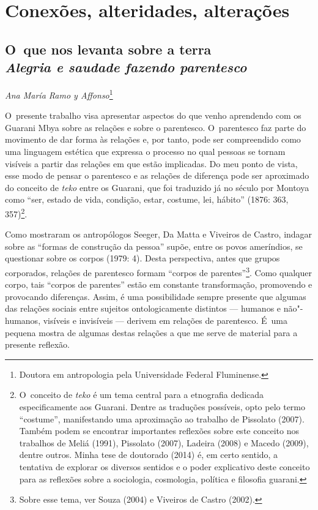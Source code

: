 \makeatletter\@openrightfalse
\movetooddpage
\part{Conexões, alteridades, alterações}
 


\chapter*{O~que nos levanta sobre a terra\\
\large{\emph{Alegria e saudade fazendo parentesco}}}


\@openrighttrue\makeatother
\begin{flushright}
\emph{Ana María Ramo y Affonso}\footnote{Doutora em antropologia pela
Universidade Federal Fluminense.}
\end{flushright}

\noindent
O~presente trabalho visa apresentar aspectos do que venho aprendendo com
os Guarani Mbya sobre as relações e sobre o parentesco. O~parentesco
faz parte do movimento de dar forma às relações e, por tanto, pode ser
compreendido como uma linguagem estética que expressa o processo no
qual pessoas se tornam visíveis a partir das relações em que estão
implicadas. Do meu ponto de vista, esse modo de pensar o parentesco e
as relações de diferença pode ser aproximado do conceito de \emph{teko} entre
os Guarani, que foi traduzido já no século  por Montoya como ``ser,
estado de vida, condição, estar, costume, lei, hábito'' (1876: 363,
357)\footnote{O~conceito de \emph{teko} é um tema central para a etnografia
dedicada especificamente aos Guarani. Dentre as traduções possíveis,
opto pelo termo ``costume'', manifestando uma aproximação ao trabalho de
Pissolato (2007). Também podem se encontrar importantes reflexões sobre
este conceito nos trabalhos de Meliá (1991), Pissolato (2007), Ladeira
(2008) e Macedo (2009), dentre outros. Minha tese de doutorado (2014)
é, em certo sentido, a tentativa de explorar os diversos sentidos e o
poder explicativo deste conceito para as reflexões sobre a sociologia,
cosmologia, política e filosofia guarani.}.

Como mostraram os antropólogos Seeger, Da Matta e Viveiros de Castro,
indagar sobre as ``formas de construção da pessoa'' supõe, entre os povos
ameríndios, se questionar sobre os corpos (1979: 4). Desta perspectiva,
antes que grupos corporados, relações de parentesco formam ``corpos de
parentes''\footnote{Sobre
esse tema, ver Souza (2004) e Viveiros de Castro (2002).}. Como
qualquer corpo, tais ``corpos de parentes'' estão em constante
transformação, promovendo e provocando diferenças. Assim, é uma
possibilidade sempre presente que algumas das relações sociais entre
sujeitos ontologicamente distintos --- humanos e não"-humanos, visíveis e
invisíveis --- derivem em relações de parentesco. É~uma pequena mostra de
algumas destas relações a que me serve de material para a presente
reflexão.

